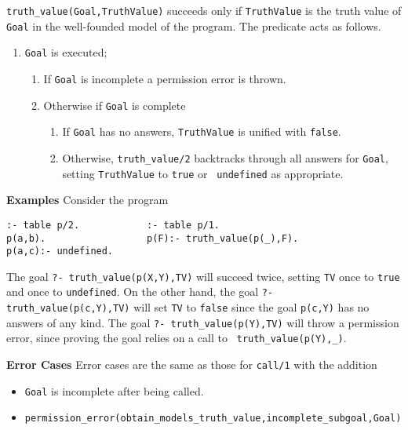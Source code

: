 \begin{description}
% 
{\tt truth\_value(Goal,TruthValue)} succeeds only if {\tt TruthValue} is
the truth value of {\tt Goal} in the well-founded model of the
program.  
The predicate acts as follows.
\begin{enumerate}
\item {\tt Goal} is executed;
\begin{enumerate}
\item If {\tt Goal} is incomplete a permission error is thrown.
\item Otherwise if {\tt Goal} is complete
\begin{enumerate}
\item If {\tt Goal} has no answers, {\tt TruthValue} is unified with
  {\tt false}.
\item Otherwise, {\tt truth\_value/2} backtracks through all answers for
  {\tt Goal}, setting {\tt TruthValue} to {\tt true} or {\tt
    undefined} as appropriate.
\end{enumerate}
\end{enumerate}
\end{enumerate}

{\bf Examples}
Consider the program
\begin{verbatim}
:- table p/2.            :- table p/1.
p(a,b).                  p(F):- truth_value(p(_),F).
p(a,c):- undefined.
\end{verbatim}
The goal {\tt ?- truth\_value(p(X,Y),TV)} will succeed twice, setting
{\tt TV} once to {\tt true} and once to {\tt undefined}.  On the other
hand, the goal {\tt ?- truth\_value(p(c,Y),TV)} will set {\tt TV} to
{\tt false} since the goal {\tt p(c,Y)} has no answers of any kind.
The goal {\tt ?- truth\_value(p(Y),TV)} will throw a permission error,
since proving the goal relies on a call to {\tt
  truth\_value(p(Y),\_)}.  

{\bf Error Cases}
Error cases are the same as those for {\tt call/1} with the addition
\begin{itemize}
\item
{\tt Goal} is incomplete after being called.
\bi
\item {\tt permission\_error(obtain\_models\_truth\_value,incomplete\_subgoal,{\tt Goal})}
\ei
\ei


\end{itemize}
\end{description}
